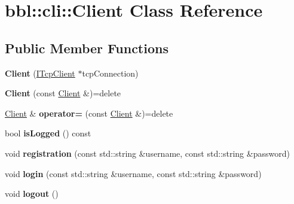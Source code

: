 \hypertarget{classbbl_1_1cli_1_1_client}{}\section{bbl\+:\+:cli\+:\+:Client Class Reference}
\label{classbbl_1_1cli_1_1_client}
\subsection*{Public Member Functions}
\begin{DoxyCompactItemize}
\item 
\mbox{\label{classbbl_1_1cli_1_1_client_ab5ab3a77c84e5bc39dc653cef343b8ac}} 
{\bfseries Client} (\hyperlink{classbbl_1_1cli_1_1_i_tcp_client}{I\+Tcp\+Client} $\ast$tcp\+Connection)
\item 
\mbox{\label{classbbl_1_1cli_1_1_client_acfc496485b229bd8c2af8d5492f16c3f}} 
{\bfseries Client} (const \hyperlink{classbbl_1_1cli_1_1_client}{Client} \&)=delete
\item 
\mbox{\label{classbbl_1_1cli_1_1_client_abd2ba96ec1ebdbbf67836257dc683332}} 
\hyperlink{classbbl_1_1cli_1_1_client}{Client} \& {\bfseries operator=} (const \hyperlink{classbbl_1_1cli_1_1_client}{Client} \&)=delete
\item 
\mbox{\label{classbbl_1_1cli_1_1_client_afcbe6046c74e86b64c1b861f5e58ffbd}} 
bool {\bfseries is\+Logged} () const
\item 
\mbox{\label{classbbl_1_1cli_1_1_client_afecc09190f29820f373b35b13f42338c}} 
void {\bfseries registration} (const std\+::string \&username, const std\+::string \&password)
\item 
\mbox{\label{classbbl_1_1cli_1_1_client_abf1626c0fd720a8ba69b811b718411da}} 
void {\bfseries login} (const std\+::string \&username, const std\+::string \&password)
\item 
\mbox{\label{classbbl_1_1cli_1_1_client_aa977795294407c10fe843b5bc28b6685}} 
void {\bfseries logout} ()
\item 

\end{DoxyCompactItemize}
